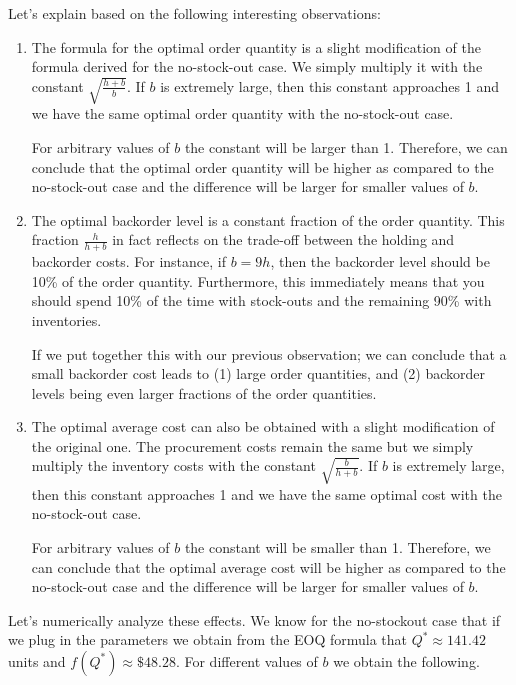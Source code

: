 \begin{solution}
Let's explain based on the following interesting observations: 
\begin{enumerate}
\item The formula for the optimal order quantity is a slight modification of the formula derived for the no-stock-out case. We simply multiply it with the constant $\sqrt{\frac{h+b}{b}}$. If $b$ is extremely large, then this constant approaches 1 and we have the same optimal order quantity with the no-stock-out case. 

For arbitrary values of $b$ the constant will be larger than 1. Therefore, we can conclude that the optimal order quantity will be higher as compared to the no-stock-out case and the difference will be larger for smaller values of $b$. 

\item The optimal backorder level is a constant fraction of the order quantity. This fraction $\frac{h}{h+b}$ in fact reflects on the trade-off between the holding and backorder costs. For instance, if $b=9h$, then the backorder level should be 10\% of the order quantity. Furthermore, this immediately means that you should spend 10\% of the time with stock-outs and the remaining 90\% with inventories. 

If we put together this with our previous observation; we can conclude that a small backorder cost leads to (1) large order quantities, and (2) backorder levels being even larger fractions of the order quantities. 

\item The optimal average cost can also be obtained with a slight modification of the original one. The procurement costs remain the same but we simply multiply the inventory costs with the constant $\sqrt{\frac{b}{h+b}}$. If $b$ is extremely large, then this constant approaches 1 and we have the same optimal cost with the no-stock-out case. 

For arbitrary values of $b$ the constant will be smaller than 1. Therefore, we can conclude that the optimal average cost will be higher as compared to the no-stock-out case and the difference will be larger for smaller values of $b$. 
\end{enumerate}

Let's numerically analyze these effects. We know for the no-stockout case that if we plug in the parameters we obtain from the EOQ formula that $Q^{*} \approx 141.42$ units and $f(Q^{*}) \approx \mathdollar 48.28$. For different values of $b$ we obtain the following. 


\end{solution}
